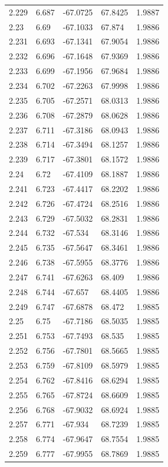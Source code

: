 \begin{tabular}{lllll}
2.229 & 6.687 & -67.0725 & 67.8425 & 1.9887 \\
2.23 & 6.69 & -67.1033 & 67.874 & 1.9886 \\
2.231 & 6.693 & -67.1341 & 67.9054 & 1.9886 \\
2.232 & 6.696 & -67.1648 & 67.9369 & 1.9886 \\
2.233 & 6.699 & -67.1956 & 67.9684 & 1.9886 \\
2.234 & 6.702 & -67.2263 & 67.9998 & 1.9886 \\
2.235 & 6.705 & -67.2571 & 68.0313 & 1.9886 \\
2.236 & 6.708 & -67.2879 & 68.0628 & 1.9886 \\
2.237 & 6.711 & -67.3186 & 68.0943 & 1.9886 \\
2.238 & 6.714 & -67.3494 & 68.1257 & 1.9886 \\
2.239 & 6.717 & -67.3801 & 68.1572 & 1.9886 \\
2.24 & 6.72 & -67.4109 & 68.1887 & 1.9886 \\
2.241 & 6.723 & -67.4417 & 68.2202 & 1.9886 \\
2.242 & 6.726 & -67.4724 & 68.2516 & 1.9886 \\
2.243 & 6.729 & -67.5032 & 68.2831 & 1.9886 \\
2.244 & 6.732 & -67.534 & 68.3146 & 1.9886 \\
2.245 & 6.735 & -67.5647 & 68.3461 & 1.9886 \\
2.246 & 6.738 & -67.5955 & 68.3776 & 1.9886 \\
2.247 & 6.741 & -67.6263 & 68.409 & 1.9886 \\
2.248 & 6.744 & -67.657 & 68.4405 & 1.9886 \\
2.249 & 6.747 & -67.6878 & 68.472 & 1.9885 \\
2.25 & 6.75 & -67.7186 & 68.5035 & 1.9885 \\
2.251 & 6.753 & -67.7493 & 68.535 & 1.9885 \\
2.252 & 6.756 & -67.7801 & 68.5665 & 1.9885 \\
2.253 & 6.759 & -67.8109 & 68.5979 & 1.9885 \\
2.254 & 6.762 & -67.8416 & 68.6294 & 1.9885 \\
2.255 & 6.765 & -67.8724 & 68.6609 & 1.9885 \\
2.256 & 6.768 & -67.9032 & 68.6924 & 1.9885 \\
2.257 & 6.771 & -67.934 & 68.7239 & 1.9885 \\
2.258 & 6.774 & -67.9647 & 68.7554 & 1.9885 \\
2.259 & 6.777 & -67.9955 & 68.7869 & 1.9885 \\

\end{tabular}
